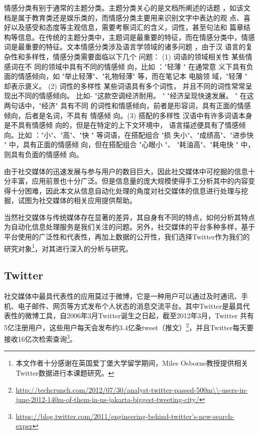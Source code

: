 情感分类有别于通常的主题分类。主题分类关心的是文档所阐述的话题 ，如该文档是属于教育类还是娱乐类的，而情感分类主要用来识别文字中表达的观 点、喜好以及感受和态度等主观信息，需要考察词汇的含义，词性，甚至句法和 篇章结构等信息。在传统的主题分类中，主题词是最重要的特征，而在情感分类中，情感词是最重要的特征。文本情感分类涉及语言学领域的诸多问题 ，由于汉 语言的复杂性和多样性，情感分类需要面临以下几个 问题： (1) 词语的领域相关性 某些情感词在不 同的领域中具有不同的情感倾 向，比如 ："轻薄 " 在通常意
义下具有负面的情感倾向，如 "举止轻薄"、"礼物轻薄" 等，而在笔记本 电脑领 域，"轻薄 " 却表示褒义。 (2) 词性的多样性 某些词语具有多个词性，
并且不同的词性常常呈现出不同的情感倾向。
比如- "这款空调经济耐用。 " "经济呈现快速发展。
" 在这两句话中，"经济" 具有不同
的词性和情感倾向，前者是形容词，具有正面的情感倾向，后者是名词，不具有 情感倾 向。(3) 搭配的多样性 汉语中有许多词语本身是不具有情感倾 向的，但是在特定的上下文环境中，
语言描述便具有了情感倾 向。比如 ："小"、"高"、"快 " 等词语，在搭配组合 "损 失小"、"成绩高"、"进歩快 " 中，具有正面的情感倾 向，但在搭配组合 "心眼小 "、 "耗油高"、"耗电快 " 中，则具有负面的情感倾 向。

  
由于社交媒体的迅速发展与参与用户的数目巨大，因此社交媒体中可挖掘的信息十分丰富，应用前景也十分广泛。但是信息量的庞大规模使得手工分析其中的内容变得十分困难，因此本文从信息自动化处理的角度对社交媒体的信息进行处理与挖掘，试图为社交媒体的相关应用提供帮助。

当然社交媒体与传统媒体存在显著的差异，其自身有不同的特点，如何分析其特点为自动化信息处理服务是我们关注的问题。另外，社交媒体的平台多种多样，基于平台使用的广泛性和代表性，再加上数据的公开性，我们选择Twitter作为我们的研究对象\footnote{本文作者十分感谢在英国爱丁堡大学留学期间，Miles Osborne教授提供相关Twitter数据进行本课题研究。}，对其进行深入的分析与研究。

\subsection{Twitter}
社交媒体中最具代表性的应用莫过于微博，它是一种用户可以通过及时通讯、手机、电子邮件、网页等方式发布个人状态的消息交流平台。其中Twitter是最具代表性的微博工具，自2006年3月Twitter诞生之日起，截至2012年3月，Twitter 共有5亿注册用户，这些用户每天会发布约3.4亿条tweet（推文）\footnote{\url{http://techcrunch.com/2012/07/30/analyst-twitter-passed-500m\\-users-in-june-2012-140m-of-them-in-us-jakarta-biggest-tweeting-city/}}，并且Twitter每天要接收16亿次检索查询\footnote{\url{https://blog.twitter.com/2011/engineering-behind-twitter's-new-search-exper}}。

